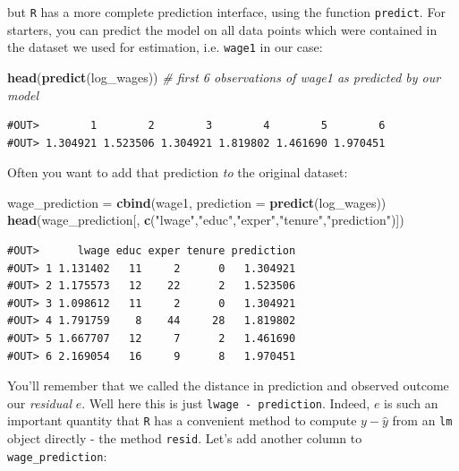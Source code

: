 \documentclass[]{book}
\newenvironment{Shaded}{\begin{snugshade}}{\end{snugshade}}
\newcommand{\KeywordTok}[1]{\textcolor[rgb]{0.13,0.29,0.53}{\textbf{#1}}}
\newcommand{\DataTypeTok}[1]{\textcolor[rgb]{0.13,0.29,0.53}{#1}}
\newcommand{\StringTok}[1]{\textcolor[rgb]{0.31,0.60,0.02}{#1}}
\newcommand{\CommentTok}[1]{\textcolor[rgb]{0.56,0.35,0.01}{\textit{#1}}}
\newcommand{\NormalTok}[1]{#1}
\begin{document}
but \texttt{R} has a more complete prediction interface, using the
function \texttt{predict}. For starters, you can predict the model on
all data points which were contained in the dataset we used for
estimation, i.e. \texttt{wage1} in our case:

\begin{Shaded}
\begin{Highlighting}[]
\KeywordTok{head}\NormalTok{(}\KeywordTok{predict}\NormalTok{(log_wages))  }\CommentTok{# first 6 observations of wage1 as predicted by our model}
\end{Highlighting}
\end{Shaded}

\begin{verbatim}
#OUT>        1        2        3        4        5        6 
#OUT> 1.304921 1.523506 1.304921 1.819802 1.461690 1.970451
\end{verbatim}

Often you want to add that prediction \emph{to} the original dataset:

\begin{Shaded}
\begin{Highlighting}[]
\NormalTok{wage_prediction =}\StringTok{ }\KeywordTok{cbind}\NormalTok{(wage1, }\DataTypeTok{prediction =} \KeywordTok{predict}\NormalTok{(log_wages))}
\KeywordTok{head}\NormalTok{(wage_prediction[, }\KeywordTok{c}\NormalTok{(}\StringTok{"lwage"}\NormalTok{,}\StringTok{"educ"}\NormalTok{,}\StringTok{"exper"}\NormalTok{,}\StringTok{"tenure"}\NormalTok{,}\StringTok{"prediction"}\NormalTok{)])}
\end{Highlighting}
\end{Shaded}

\begin{verbatim}
#OUT>      lwage educ exper tenure prediction
#OUT> 1 1.131402   11     2      0   1.304921
#OUT> 2 1.175573   12    22      2   1.523506
#OUT> 3 1.098612   11     2      0   1.304921
#OUT> 4 1.791759    8    44     28   1.819802
#OUT> 5 1.667707   12     7      2   1.461690
#OUT> 6 2.169054   16     9      8   1.970451
\end{verbatim}

You'll remember that we called the distance in prediction and observed
outcome our \emph{residual} \(e\). Well here this is just
\texttt{lwage\ -\ prediction}. Indeed, \(e\) is such an important
quantity that \texttt{R} has a convenient method to compute
\(y - \hat{y}\) from an \texttt{lm} object directly - the method
\texttt{resid}. Let's add another column to \texttt{wage\_prediction}:
\end{document}
